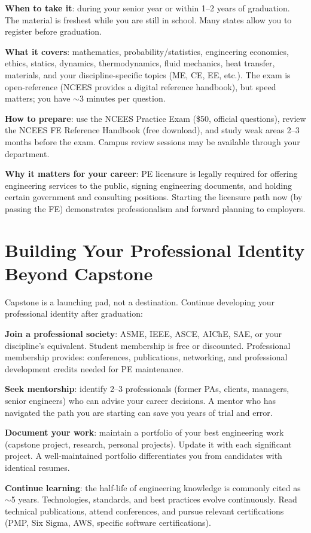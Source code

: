 \textbf{When to take it}: during your senior year or within 1--2 years of graduation. The material is freshest while you are still in school. Many states allow you to register before graduation.

\textbf{What it covers}: mathematics, probability/statistics, engineering economics, ethics, statics, dynamics, thermodynamics, fluid mechanics, heat transfer, materials, and your discipline-specific topics (ME, CE, EE, etc.). The exam is open-reference (NCEES provides a digital reference handbook), but speed matters; you have $\sim$3 minutes per question.

\textbf{How to prepare}: use the NCEES Practice Exam (\$50, official questions), review the NCEES FE Reference Handbook (free download), and study weak areas 2--3 months before the exam. Campus review sessions may be available through your department.

\textbf{Why it matters for your career}: PE licensure is legally required for offering engineering services to the public, signing engineering documents, and holding certain government and consulting positions. Starting the licensure path now (by passing the FE) demonstrates professionalism and forward planning to employers.

\section{Building Your Professional Identity Beyond Capstone}
Capstone is a launching pad, not a destination. Continue developing your professional identity after graduation:

\textbf{Join a professional society}: ASME, IEEE, ASCE, AIChE, SAE, or your discipline's equivalent. Student membership is free or discounted. Professional membership provides: conferences, publications, networking, and professional development credits needed for PE maintenance.

\textbf{Seek mentorship}: identify 2--3 professionals (former PAs, clients, managers, senior engineers) who can advise your career decisions. A mentor who has navigated the path you are starting can save you years of trial and error.

\textbf{Document your work}: maintain a portfolio of your best engineering work (capstone project, research, personal projects). Update it with each significant project. A well-maintained portfolio differentiates you from candidates with identical resumes.

\textbf{Continue learning}: the half-life of engineering knowledge is commonly cited as $\sim$5 years. Technologies, standards, and best practices evolve continuously. Read technical publications, attend conferences, and pursue relevant certifications (PMP, Six Sigma, AWS, specific software certifications).



